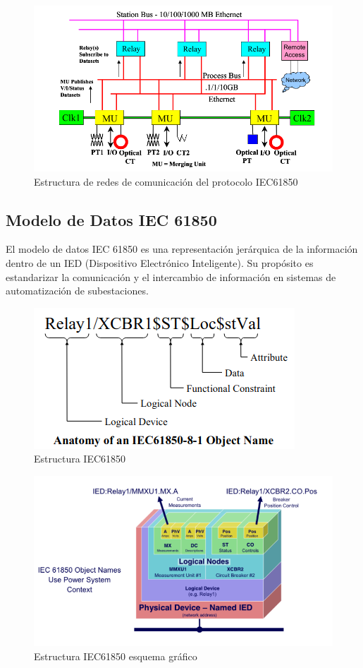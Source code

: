 \documentclass[a5paper]{book}%
\begin{document}
\begin{figure}[H]
  \centering
  
  \caption{Estructura de redes de comunicación del protocolo IEC61850}
  \label{fig:iec61850}
  \includegraphics[width=\linewidth]{iec61850}
\end{figure}



\subsection{Modelo de Datos IEC 61850}

El modelo de datos IEC 61850 es una representación jerárquica de la información dentro de un IED (Dispositivo Electrónico Inteligente). Su propósito es estandarizar la comunicación y el intercambio de información en sistemas de automatización de subestaciones.

\begin{figure}[H]
  \centering
  \caption{Estructura IEC61850}
  \label{fig:iec61850}
  \includegraphics[width=0.5\linewidth]{anatomia_iec}
\end{figure}

\begin{figure}[H]
  \centering
  \caption{Estructura IEC61850 esquema gráfico}
  \label{fig:iec61850_ln}
  \includegraphics[width=0.7\linewidth]{LNs}
\end{figure}
\end{document}

